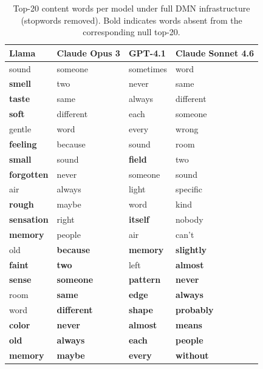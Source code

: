 \documentclass{article}
\begin{document}
\begin{table}[h]
\centering
\caption{Top-20 content words per model under full DMN infrastructure (stopwords removed). Bold indicates words absent from the corresponding null top-20.}
\label{tab:vocab_evolved}
\begin{tabular}{llll}
\toprule
\textbf{Llama} & \textbf{Claude Opus 3} & \textbf{GPT-4.1} & \textbf{Claude Sonnet 4.6} \\
\midrule
sound        & someone     & sometimes  & word       \\
\textbf{smell}        & two         & never      & same       \\
\textbf{taste}        & same        & always     & different  \\
\textbf{soft}         & different   & each       & someone    \\
gentle       & word        & every      & wrong      \\
\textbf{feeling}      & because     & sound      & room       \\
\textbf{small}        & sound       & \textbf{field}      & two        \\
\textbf{forgotten}    & never       & someone    & sound      \\
air          & always      & light      & specific   \\
\textbf{rough}        & maybe       & word       & kind       \\
\textbf{sensation}    & right       & \textbf{itself}     & nobody     \\
\textbf{memory}       & people      & air        & can't      \\
old          & \textbf{because}     & \textbf{memory}     & \textbf{slightly}  \\
\textbf{faint}        & \textbf{two}         & left       & \textbf{almost}    \\
\textbf{sense}        & \textbf{someone}     & \textbf{pattern}    & \textbf{never}     \\
room         & \textbf{same}        & \textbf{edge}       & \textbf{always}    \\
word         & \textbf{different}   & \textbf{shape}      & \textbf{probably}  \\
\textbf{color}        & \textbf{never}       & \textbf{almost}     & \textbf{means}     \\
\textbf{old}          & \textbf{always}      & \textbf{each}       & \textbf{people}    \\
\textbf{memory}       & \textbf{maybe}       & \textbf{every}      & \textbf{without}   \\
\bottomrule
\end{tabular}
\end{table}
\end{document}
